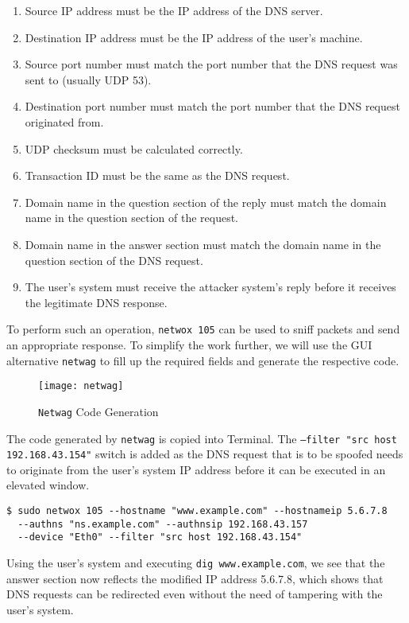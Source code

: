 \documentclass[a4paper,12pt]{article}
\begin{document}
		\begin{enumerate}
		\itemsep0em
		\item Source IP address must be the IP address of the DNS server.
		\item Destination IP address must be the IP address of the user's machine.
		\item Source port number must match the port number that the DNS request was sent to (usually UDP 53).
		\item Destination port number must match the port number that the DNS request originated from.
		\item UDP checksum must be calculated correctly.
		\item Transaction ID must be the same as the DNS request.
		\item Domain name in the question section of the reply must match the domain name in the question section of the request.
		\item Domain name in the answer section must match the domain name in the question section of the DNS request.
		\item The user's system must receive the attacker system's reply before it receives the legitimate DNS response.
		\end{enumerate}
		\begin{par}
		\noindent To perform such an operation, \texttt{netwox 105} can be used to sniff packets and send an appropriate response. To simplify the work further, we will use the GUI alternative \texttt{netwag} to fill up the required fields and generate the respective code.\end{par}
		
\begin{figure}[H]
\centering
\texttt{[image: netwag]}
\caption{\texttt{Netwag} Code Generation}
\label{fig:netwag}
\end{figure}
\noindent The code generated by \texttt{netwag} is copied into Terminal. The \texttt{--filter "src host 192.168.43.154"} switch is added as the DNS request that is to be spoofed needs to originate from the user's system IP address before it can be executed in an elevated window.
\begin{verbatim}
$ sudo netwox 105 --hostname "www.example.com" --hostnameip 5.6.7.8 
  --authns "ns.example.com" --authnsip 192.168.43.157 
  --device "Eth0" --filter "src host 192.168.43.154"
\end{verbatim}
Using the user's system and executing \texttt{dig www.example.com}, we see that the answer section now reflects the modified IP address 5.6.7.8, which shows that DNS requests can be redirected even without the need of tampering with the user's system.
\end{document}
